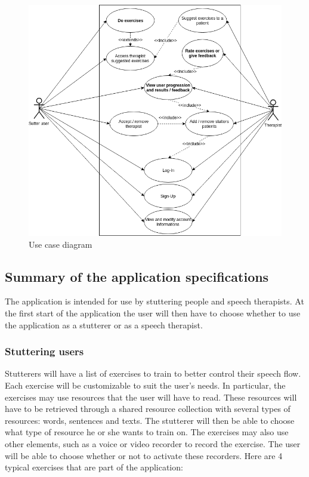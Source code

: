 \begin{figure}[h]
  \includegraphics[width=.9\linewidth]{content/imgs/usecase.png}
  \caption{Use case diagram}
  \label{fig:srs}
\end{figure}

\subsection{Summary of the application specifications}
\label{sec:summary_cdc}

The application is intended for use by stuttering people and speech therapists. At the first start of the application the user will then have to choose whether to use the application as a stutterer or as a speech therapist.

\subsubsection{Stuttering users}

Stutterers will have a list of exercises to train to better control their speech flow. Each exercise will be customizable to suit the user's needs. In particular, the exercises may use resources that the user will have to read. These resources will have to be retrieved through a shared resource collection with several types of resources: words, sentences and texts. The stutterer will then be able to choose what type of resource he or she wants to train on. The exercises may also use other elements, such as a voice or video recorder to record the exercise. The user will be able to choose whether or not to activate these recorders. Here are 4 typical exercises that are part of the application:


